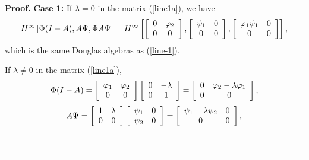 \documentclass{article}%
\newenvironment{proof}[1][Proof]{\noindent\textbf{#1.} }{\ \rule{0.5em}{0.5em}}
\begin{document}
\begin{proof}
\textbf{{Case 1:}} If $\lambda=0$ in the matrix (\ref{line1a}), we have
\[
H^{\infty}\left[  \Phi(I-A),A\Psi,\Phi A\Psi\right]  =H^{\infty} \left[
\left[
\begin{array}
[c]{cc}%
0 & \varphi_{2}\\
0 & 0
\end{array}
\right]  ,\left[
\begin{array}
[c]{cc}%
\psi_{1} & 0\\
0 & 0
\end{array}
\right]  ,\left[
\begin{array}
[c]{cc}%
\varphi_{1}\psi_{1} & 0\\
0 & 0
\end{array}
\right]  \right]  ,
\]
which is the same Douglas algebras as (\ref{line-1}).

If $\lambda\neq0$ in the matrix (\ref{line1a}),%
\begin{align}
\Phi(I-A)=\left[
\begin{array}
[c]{cc}%
\varphi_{1} & \varphi_{2}\\
0 & 0
\end{array}
\right]  \left[
\begin{array}
[c]{cc}%
0 & -\lambda\\
0 & 1
\end{array}
\right]  =\left[
\begin{array}
[c]{cc}%
0 & \varphi_{2}-\lambda\varphi_{1}\\
0 & 0
\end{array}
\right]  ,\nonumber
\end{align}
\begin{align}
A\Psi= \left[
\begin{array}
[c]{cc}%
1 & \lambda\\
0 & 0
\end{array}
\right]  \left[
\begin{array}
[c]{cc}%
\psi_{1} & 0\\
\psi_{2} & 0
\end{array}
\right]  =\left[
\begin{array}
[c]{cc}%
\psi_{1}+\lambda\psi_{2} & 0\\
0 & 0
\end{array}
\right]  ,\nonumber
\end{align}
%


\end{proof}
\end{document}
